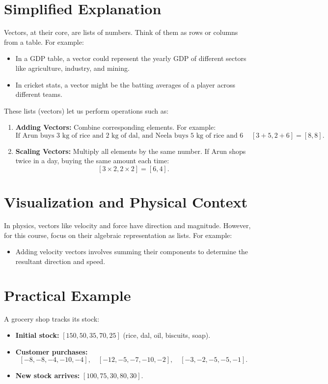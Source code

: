 \documentclass{article}
\begin{document}
\section*{Simplified Explanation}

Vectors, at their core, are lists of numbers. Think of them as rows or columns from a table. For example:
\begin{itemize}
  \item In a GDP table, a vector could represent the yearly GDP of different sectors like agriculture, industry, and mining.
  \item In cricket stats, a vector might be the batting averages of a player across different teams.
\end{itemize}

These lists (vectors) let us perform operations such as:
\begin{enumerate}
  \item \textbf{Adding Vectors:} Combine corresponding elements. For example:
    \[
      \text{If Arun buys 3 kg of rice and 2 kg of dal, and Neela buys 5 kg of rice and 6 kg of dal, their combined shopping list is } [3+5, 2+6] = [8, 8].
    \]

  \item \textbf{Scaling Vectors:} Multiply all elements by the same number. If Arun shops twice in a day, buying the same amount each time:
    \[
      [3 \times 2, 2 \times 2] = [6, 4].
    \]
\end{enumerate}

\section*{Visualization and Physical Context}

In physics, vectors like velocity and force have direction and magnitude. However, for this course, focus on their algebraic representation as lists. For example:
\begin{itemize}
  \item Adding velocity vectors involves summing their components to determine the resultant direction and speed.
\end{itemize}

\section*{Practical Example}

A grocery shop tracks its stock:
\begin{itemize}
  \item \textbf{Initial stock:} $[150, 50, 35, 70, 25]$ (rice, dal, oil, biscuits, soap).
  \item \textbf{Customer purchases:}
    \[
      [-8, -8, -4, -10, -4], \quad [-12, -5, -7, -10, -2], \quad [-3, -2, -5, -5, -1].
    \]
  \item \textbf{New stock arrives:} $[100, 75, 30, 80, 30]$.
\end{itemize}
\end{document}
